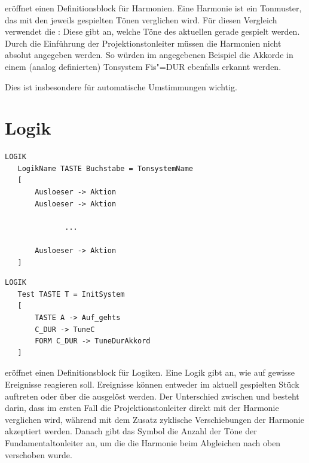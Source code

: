 {


 eröffnet einen Definitionsblock für Harmonien. Eine
Harmonie ist ein Tonmuster, das mit den jeweils gespielten Tönen
verglichen wird. Für diesen Vergleich verwendet \mutabor{} die
: Diese gibt an,
welche Töne des aktuellen 
gerade gespielt werden. Durch die Einführung der Projektionstonleiter
müssen die Harmonien nicht absolut angegeben werden. So würden im
angegebenen Beispiel die Akkorde in einem (analog definierten)
Tonsystem Fis"=DUR ebenfalls erkannt werden.


Dies ist insbesondere für automatische Umstimmungen wichtig. 


\section{Logik}
\label{sec:SX_LOGIC}



\begin{verbatim}
LOGIK
   LogikName TASTE Buchstabe = TonsystemName
   [
       Ausloeser -> Aktion
       Ausloeser -> Aktion

              ...

       Ausloeser -> Aktion
   ]
\end{verbatim}




\begin{verbatim}
LOGIK 
   Test TASTE T = InitSystem
   [
       TASTE A -> Auf_gehts
       C_DUR -> TuneC 
       FORM C_DUR -> TuneDurAkkord 
   ]
\end{verbatim}




 eröffnet einen Definitionsblock für Logiken. Eine
Logik gibt an, wie \mutabor{} auf gewisse Ereignisse reagieren soll.
Ereignisse können entweder im aktuell gespielten Stück auftreten oder
über die  ausgelöst werden. Der
Unterschied zwischen  und  besteht
darin, dass im ersten Fall die Projektionstonleiter direkt mit der
Harmonie verglichen wird, während mit dem Zusatz
 zyklische Verschiebungen der
Harmonie akzeptiert werden. Danach gibt das Symbol 
die Anzahl der Töne der Fundamentaltonleiter an, um die die Harmonie
beim Abgleichen nach oben verschoben wurde.


}
